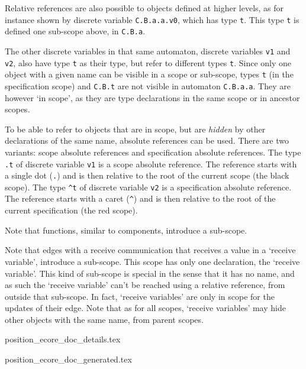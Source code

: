 \documentclass{report}
\begin{document}
Relative references are also possible to objects defined at higher levels,
as for instance shown by discrete variable \texttt{C.B.a.a.v0}, which has type
\texttt{t}. This type \texttt{t} is defined one sub-scope above, in
\texttt{C.B.a}.

The other discrete variables in that same automaton, discrete variables
\texttt{v1} and
\texttt{v2}, also have type \texttt{t} as their type, but refer to different
types \texttt{t}. Since only one object with a given name can be visible in
a scope or sub-scope, types \texttt{t} (in the specification scope) and
\texttt{C.B.t} are not visible in automaton \texttt{C.B.a.a}. They are however
`in scope', as they are type declarations in the same scope or in ancestor
scopes.

To be able to refer to objects that are in scope, but are \emph{hidden} by
other declarations of the same name, absolute references can be used. There
are two variants: scope absolute references and specification absolute
references. The type \texttt{.t} of discrete variable \texttt{v1} is a scope
absolute
reference. The reference starts with a single dot (\texttt{.}) and is then
relative to the root of the current scope (the black scope). The type
\texttt{\^{}t} of discrete variable \texttt{v2} is a specification absolute
reference. The reference starts with a caret (\texttt{\^}) and is then
relative to the root of the current specification (the red scope).

Note that functions, similar to components, introduce a sub-scope.

Note that edges with a receive communication that receives a value in a
`receive variable', introduce a sub-scope. This scope has only one declaration,
the `receive variable'. This kind of sub-scope is special in the sense that
it has no name, and as such the `receive variable' can't be reached using a
relative reference, from outside that sub-scope. In fact, `receive variables'
are only in scope for the updates of their edge. Note that as for all
scopes, `receive variables' may hide other objects with the same name, from
parent scopes.


\newpage


       {position_ecore_doc_details.tex}



       {position_ecore_doc_generated.tex}

\end{document}
